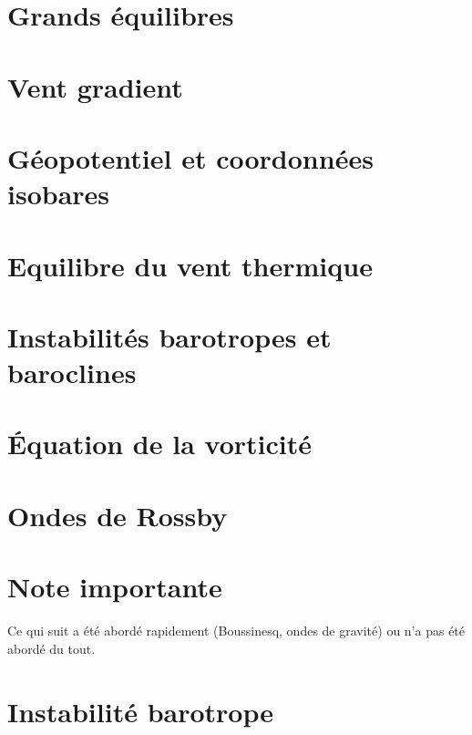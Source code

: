 \documentclass[a4paper,DIV16,10pt]{scrartcl}
\begin{document}
 \inidoc

\newpage
\section{Grands équilibres}


\newpage
\section{Vent gradient}


\newpage
\section{Géopotentiel et coordonnées isobares}


\newpage
\section{Equilibre du vent thermique}


\newpage
\section{Instabilités barotropes et baroclines}


\newpage
\section{\'Equation de la vorticité}


\newpage
\section{Ondes de Rossby}


\newpage
\section{Note importante}
\Huge
Ce qui suit a été abordé rapidement
(Boussinesq, ondes de gravité)
ou n'a pas été abordé du tout.
\normalsize

\newpage
\section{Instabilité barotrope}

\end{document}
